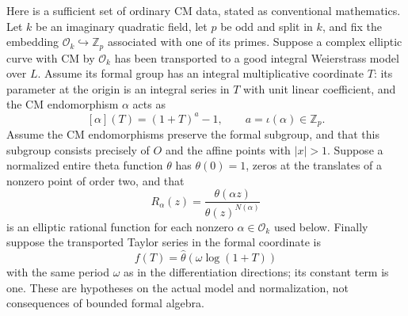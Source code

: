 Here is a sufficient set of ordinary CM data, stated as conventional
mathematics.  Let $k$ be an imaginary quadratic field, let $p$ be
odd and split in $k$, and fix the embedding
$\mathcal O_k\hookrightarrow\mathbb Z_p$ associated with one
of its primes.  Suppose a complex elliptic curve with CM by
$\mathcal O_k$ has been transported to a good integral Weierstrass
model over $L$.  Assume its formal group has an integral
multiplicative coordinate $T$: its parameter at the origin is an
integral series in $T$ with unit linear coefficient, and the CM
endomorphism $\alpha$ acts as
\[
                         [\alpha](T)=(1+T)^{a}-1,
             \qquad a=\iota(\alpha)\in\mathbb Z_p.
 \tag{OT14}
\]
Assume the CM endomorphisms preserve the formal subgroup, and that
this subgroup consists precisely of $O$ and the affine points with
$|x|>1$.  Suppose a normalized entire theta function $\theta$
has $\theta(0)=1$, zeros at the translates of a nonzero point of
order two, and that
\[
              R_\alpha(z)=\frac{\theta(\alpha z)}
                                     {\theta(z)^{N(\alpha)}}
 \tag{OT15}
\]
is an elliptic rational function for each nonzero
$\alpha\in\mathcal O_k$ used below.  Finally suppose the
transported Taylor series in the formal coordinate is
\[
               f(T)=\widehat\theta(\omega\log(1+T))
 \tag{OT16}
\]
with the same period $\omega$ as in the differentiation
directions; its constant term is one.  These are hypotheses on
the actual model and normalization, not consequences of bounded
formal algebra.

